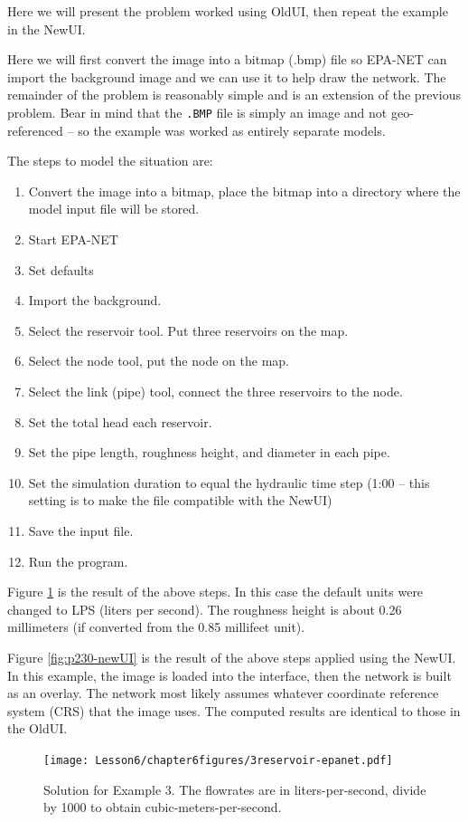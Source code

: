 Here we will present the problem worked using OldUI, then repeat the example in the NewUI.

Here we will first convert the image into a bitmap (.bmp) file so EPA-NET can import the background image and we can use it to help draw the network.  The remainder of the problem is reasonably simple and is an extension of the previous problem.
Bear in mind that the \texttt{.BMP} file is simply an image and not geo-referenced -- so the example was worked as entirely separate models.

The steps to model the situation are:
\begin{enumerate}
\item Convert the image into a bitmap, place the bitmap into a directory where the model input file will be stored.
\item Start EPA-NET
\item Set defaults
\item Import the background.
\item Select the reservoir tool.  Put three reservoirs on the map.
\item Select the node tool, put the node on the map.
\item Select the link (pipe) tool, connect the three reservoirs to the node.  
\item Set the total head each reservoir.
\item Set the pipe length, roughness height, and diameter in each pipe.
\item Set the simulation duration to equal the hydraulic time step (1:00 -- this setting is to make the file compatible with the NewUI)
\item Save the input file.
\item Run the program.   
\end{enumerate}

Figure \ref{fig:3reservoir-epanet} is the result of the above steps.   In this case the default units were changed to LPS (liters per second).  The roughness height is about 0.26 millimeters (if converted from the 0.85 millifeet unit).

Figure \ref{fig:p230-newUI} is the result of the above steps applied using the NewUI.  
In this example, the image is loaded into the interface, then the network is built as an overlay. 
The network most likely assumes whatever coordinate reference system (CRS) that the image uses.
The computed results are identical to those in the OldUI.

\newpage
\begin{figure}[h!] %
   \centering
   \texttt{[image: Lesson6/chapter6figures/3reservoir-epanet.pdf]} 
   \caption{Solution for Example 3. The flowrates are in liters-per-second, divide by 1000 to obtain cubic-meters-per-second.}
   \label{fig:3reservoir-epanet}
\end{figure}

